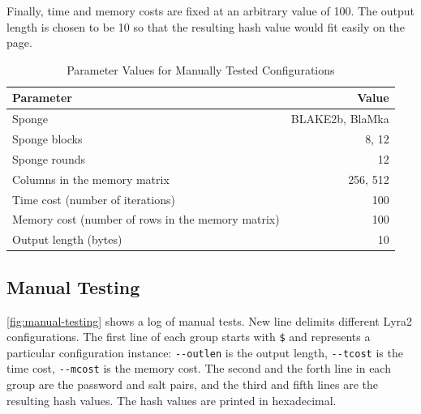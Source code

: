 Finally, time and memory costs are fixed at an arbitrary value of 100. The output length is chosen to be 10 so that the resulting hash value would fit easily on the page.

\begin{table}
    \begin{center}
        \begin{tabular}{l r}
            Parameter & Value \\ \hline
            Sponge & BLAKE2b, BlaMka \\
            Sponge blocks & 8, 12 \\
            Sponge rounds & 12 \\
            Columns in the memory matrix & 256, 512 \\
            Time cost (number of iterations) & 100 \\
            Memory cost (number of rows in the memory matrix) & 100 \\
            Output length (bytes) & 10 \\
        \end{tabular}
    \end{center}
    \caption{Parameter Values for Manually Tested Configurations}
    \label{table:configuration-summary}
\end{table}

\subsection{Manual Testing}
\label{sec:manual-testing}

\autoref{fig:manual-testing} shows a log of manual tests. New line delimits different Lyra2 configurations. The first line of each group starts with \texttt{\$} and represents a particular configuration instance: \verb|--outlen| is the output length, \verb|--tcost| is the time cost, \verb|--mcost| is the memory cost. The second and the forth line in each group are the password and salt pairs, and the third and fifth lines are the resulting hash values. The hash values are printed in hexadecimal.

